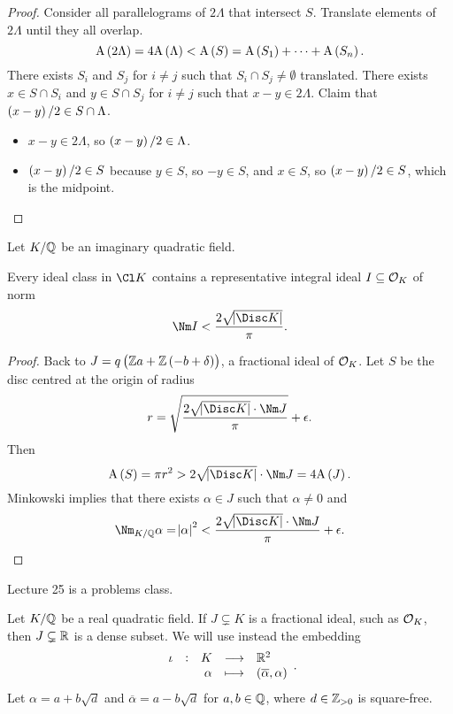 \begin{proof}
Consider all parallelograms of $ 2\Lambda $ that intersect $ S $. Translate elements of $ 2\Lambda $ until they all overlap.
$$ \A\br{2\Lambda} = 4\A\br{\Lambda} < \A\br{S} = \A\br{S_1} + \dots + \A\br{S_n}. $$
There exists $ S_i $ and $ S_j $ for $ i \ne j $ such that $ S_i \cap S_j \ne \emptyset $ translated. There exists $ x \in S \cap S_i $ and $ y \in S \cap S_j $ for $ i \ne j $ such that $ x - y \in 2\Lambda $. Claim that $ \br{x - y} / 2 \in S \cap \Lambda $.
\begin{itemize}
\item $ x - y \in 2\Lambda $, so $ \br{x - y} / 2 \in \Lambda $.
\item $ \br{x - y} / 2 \in S $ because $ y \in S $, so $ -y \in S $, and $ x \in S $, so $ \br{x - y} / 2 \in S $, which is the midpoint.
\end{itemize}
\end{proof}

Let $ K / \mathbb{Q} $ be an imaginary quadratic field.

\begin{theorem}
Every ideal class in $ \Cl K $ contains a representative integral ideal $ I \subseteq \mathcal{O}_K $ of norm
$$ \Nm I < \dfrac{2\sqrt{\abs{\Disc K}}}{\pi}. $$
\end{theorem}

\begin{proof}
Back to $ J = q\br{\ZZ a + \ZZ\br{-b + \delta}} $, a fractional ideal of $ \mathcal{O}_K $. Let $ S $ be the disc centred at the origin of radius
$$ r = \sqrt{\dfrac{2\sqrt{\abs{\Disc K}} \cdot \Nm J}{\pi}} + \epsilon. $$
Then
$$ \A\br{S} = \pi r^2 > 2\sqrt{\abs{\Disc K}} \cdot \Nm J = 4\A\br{J}. $$
Minkowski implies that there exists $ \alpha \in J $ such that $ \alpha \ne 0 $ and
$$ \Nm_{K / \QQ} \alpha = \abs{\alpha}^2 < \dfrac{2\sqrt{\abs{\Disc K}} \cdot \Nm J}{\pi} + \epsilon. $$
\end{proof}


Lecture 25 is a problems class.

\pagebreak


Let $ K / \mathbb{Q} $ be a real quadratic field. If $ J \subsetneq K $ is a fractional ideal, such as $ \mathcal{O}_K $, then $ J \subsetneq \mathbb{R} $ is a dense subset. We will use instead the embedding
$$ \function[\iota]{K}{\RR^2}{\alpha}{\br{\overline{\alpha}, \alpha}}. $$
Let $ \alpha = a + b\sqrt{d} $ and $ \overline{\alpha} = a - b\sqrt{d} $ for $ a, b \in \mathbb{Q} $, where $ d \in \mathbb{Z}_{> 0} $ is square-free.

